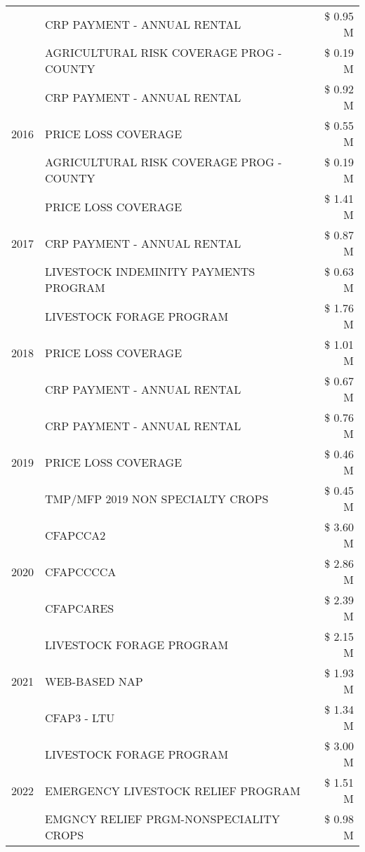\begin{tabular}{llr}
 & CRP PAYMENT - ANNUAL RENTAL & \$ 0.95 M \\
 & AGRICULTURAL RISK COVERAGE PROG - COUNTY & \$ 0.19 M \\
\cline{1-3}
\multirow[t]{3}{*}{2016} & CRP PAYMENT - ANNUAL RENTAL & \$ 0.92 M \\
 & PRICE LOSS COVERAGE & \$ 0.55 M \\
 & AGRICULTURAL RISK COVERAGE PROG - COUNTY & \$ 0.19 M \\
\cline{1-3}
\multirow[t]{3}{*}{2017} & PRICE LOSS COVERAGE & \$ 1.41 M \\
 & CRP PAYMENT - ANNUAL RENTAL & \$ 0.87 M \\
 & LIVESTOCK INDEMINITY PAYMENTS PROGRAM & \$ 0.63 M \\
\cline{1-3}
\multirow[t]{3}{*}{2018} & LIVESTOCK FORAGE PROGRAM & \$ 1.76 M \\
 & PRICE LOSS COVERAGE & \$ 1.01 M \\
 & CRP PAYMENT - ANNUAL RENTAL & \$ 0.67 M \\
\cline{1-3}
\multirow[t]{3}{*}{2019} & CRP PAYMENT - ANNUAL RENTAL & \$ 0.76 M \\
 & PRICE LOSS COVERAGE & \$ 0.46 M \\
 & TMP/MFP 2019 NON SPECIALTY CROPS & \$ 0.45 M \\
\cline{1-3}
\multirow[t]{3}{*}{2020} & CFAPCCA2 & \$ 3.60 M \\
 & CFAPCCCCA & \$ 2.86 M \\
 & CFAPCARES & \$ 2.39 M \\
\cline{1-3}
\multirow[t]{3}{*}{2021} & LIVESTOCK FORAGE PROGRAM & \$ 2.15 M \\
 & WEB-BASED NAP & \$ 1.93 M \\
 & CFAP3 - LTU & \$ 1.34 M \\
\cline{1-3}
\multirow[t]{3}{*}{2022} & LIVESTOCK FORAGE PROGRAM & \$ 3.00 M \\
 & EMERGENCY LIVESTOCK RELIEF PROGRAM & \$ 1.51 M \\
 & EMGNCY RELIEF PRGM-NONSPECIALITY CROPS & \$ 0.98 M \\
\cline{1-3}
\bottomrule
\end{tabular}
